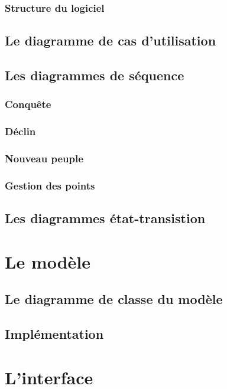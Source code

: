 \documentclass[11pt]{report}
\begin{document}
		\subsection{Structure du logiciel}

	\section{Le diagramme de cas d'utilisation}

	\section{Les diagrammes de séquence}

		\subsection{Conquête}

		\subsection{Déclin}

		\subsection{Nouveau peuple}

		\subsection{Gestion des points}

	\section{Les diagrammes état-transistion}

\chapter{Le modèle}

	\section{Le diagramme de classe du modèle}

	\section{Implémentation}

\chapter{L'interface}
\end{document}
